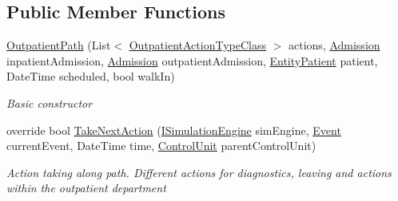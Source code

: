 \subsection*{Public Member Functions}
\begin{DoxyCompactItemize}
\item 
\hyperlink{class_general_health_care_elements_1_1_department_models_1_1_outpatient_1_1_outpatient_path_a2cc5869f745ee3cf636e8fcabb4c84eb}{Outpatient\+Path} (List$<$ \hyperlink{class_general_health_care_elements_1_1_general_classes_1_1_action_types_and_paths_1_1_outpatient_action_type_class}{Outpatient\+Action\+Type\+Class} $>$ actions, \hyperlink{class_general_health_care_elements_1_1_treatment_admission_types_1_1_admission}{Admission} inpatient\+Admission, \hyperlink{class_general_health_care_elements_1_1_treatment_admission_types_1_1_admission}{Admission} outpatient\+Admission, \hyperlink{class_general_health_care_elements_1_1_entities_1_1_entity_patient}{Entity\+Patient} patient, Date\+Time scheduled, bool walk\+In)
\begin{DoxyCompactList}\small\item\em Basic constructor \end{DoxyCompactList}\item 
override bool \hyperlink{class_general_health_care_elements_1_1_department_models_1_1_outpatient_1_1_outpatient_path_a0f14d623314c7767c7a8ba8022803b39}{Take\+Next\+Action} (\hyperlink{interface_simulation_core_1_1_simulation_classes_1_1_i_simulation_engine}{I\+Simulation\+Engine} sim\+Engine, \hyperlink{class_simulation_core_1_1_h_c_c_m_elements_1_1_event}{Event} current\+Event, Date\+Time time, \hyperlink{class_simulation_core_1_1_h_c_c_m_elements_1_1_control_unit}{Control\+Unit} parent\+Control\+Unit)
\begin{DoxyCompactList}\small\item\em Action taking along path. Different actions for diagnostics, leaving and actions within the outpatient department \end{DoxyCompactList}\end{DoxyCompactItemize}
